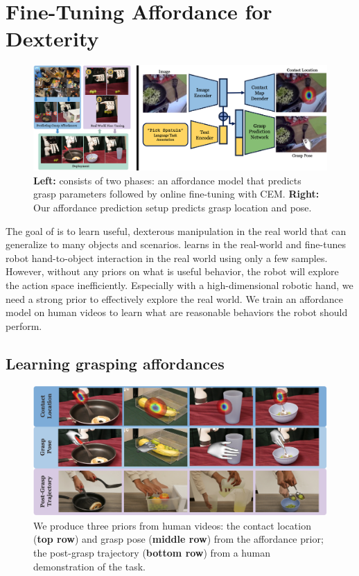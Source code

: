 \section{Fine-Tuning Affordance for Dexterity}
\label{sec:method}

\begin{figure}[H]
\centering
\includegraphics[width=\linewidth]{figs/method_overview.pdf}
\vspace{-0.2in}
  \caption{\small \textbf{Left:}  \ours consists of two phases: an affordance model that predicts grasp parameters followed by online fine-tuning with CEM. \textbf{Right:} Our affordance prediction setup predicts grasp location and pose.}
 \label{fig:aff_method}
 \vspace{-0.15in}
\end{figure}

The goal of \ours is to learn useful, dexterous manipulation in the real world that can generalize to many objects and scenarios.  \ours learns in the real-world and fine-tunes robot hand-to-object interaction in the real world using only a few samples. However, without any priors on what is useful behavior, the robot will explore the action space inefficiently. Especially with a high-dimensional robotic hand, we need a strong prior to effectively explore the real world. We train an affordance model on human videos to learn what are reasonable behaviors the robot should perform.  

\subsection{Learning grasping affordances}
\begin{figure}[t]
\centering
\includegraphics[width=\linewidth]{figs/aff_results.pdf}
\vspace{-0.2in}
  \caption{\small We produce three priors from human videos: the contact location (\textbf{top row}) and grasp pose (\textbf{middle row}) from the affordance prior; the post-grasp trajectory (\textbf{bottom row}) from a human demonstration of the task.}
 \label{fig:aff_results}
 \vspace{-0.15in}
\end{figure}


